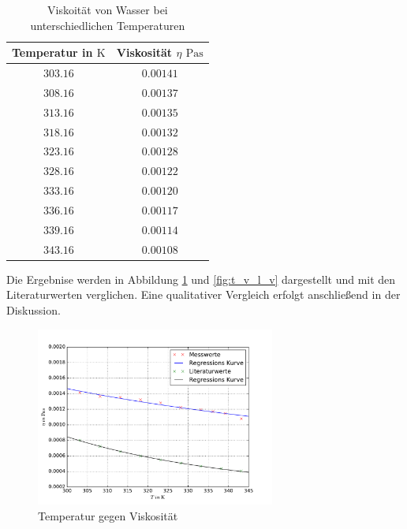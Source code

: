 \begin{table}
\centering
\begin{tabular} {cc}
  \toprule
  Temperatur in $\si{\kelvin}$ & Viskosität $\eta$ $\si{\pascal\second}$ \\
  \midrule
  $\num{303.16}$ & $\num{0.00141}$ \\
  $\num{308.16}$ & $\num{0.00137}$ \\
  $\num{313.16}$ & $\num{0.00135}$ \\
  $\num{318.16}$ & $\num{0.00132}$ \\
  $\num{323.16}$ & $\num{0.00128}$ \\
  $\num{328.16}$ & $\num{0.00122}$ \\
  $\num{333.16}$ & $\num{0.00120}$ \\
  $\num{336.16}$ & $\num{0.00117}$ \\
  $\num{339.16}$ & $\num{0.00114}$ \\
  $\num{343.16}$ & $\num{0.00108}$ \\
\bottomrule
\end{tabular}
\caption{Viskoität von Wasser bei unterschiedlichen Temperaturen} %
\label{tab:visko_wasser_temp}
\end{table}

Die Ergebnise werden in Abbildung \ref{fig:t_v_v} und \ref{fig:t_v_l_v} dargestellt und mit den Literaturwerten verglichen.  %
Eine qualitativer Vergleich erfolgt anschließend in der Diskussion. %

\FloatBarrier
\begin{figure}
\centering
\includegraphics[width=0.7\textwidth]{pics/viskositaet_temp_mit_lit.pdf}
\caption{Temperatur gegen Viskosität} %
\label{fig:t_v_v}
\end{figure}

